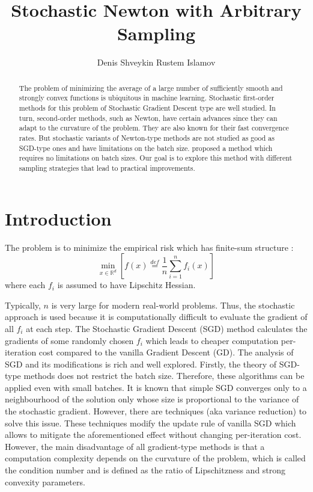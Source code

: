 \documentclass{article}
\title{Stochastic Newton with Arbitrary Sampling}
\author{Denis Shveykin
	\And
	Rustem Islamov
}
\date{}
\theoremstyle{definition}
\theoremstyle{assumption}
\theoremstyle{lemma}
\theoremstyle{theorem}
\theoremstyle{proposition}
\begin{document}
	
\maketitle

\begin{abstract}
	
	The problem of minimizing the average of a large number of sufficiently smooth and strongly convex functions is ubiquitous in machine learning. Stochastic first-order methods for this problem of Stochastic Gradient Descent type are well studied. In turn, second-order methods, such as Newton, have certain advances since they can adapt to the curvature of the problem. They are also known for their fast convergence rates. But stochastic variants of Newton-type methods are not studied as good as SGD-type ones and have limitations on the batch size. \cite{kovalev2019stochastic} proposed a method which requires no limitations on batch sizes. Our goal is to explore this method with different sampling strategies that lead to practical improvements.
	
\end{abstract}



\section{Introduction}

	The problem is to minimize the empirical risk which has finite-sum structure \cite{kovalev2019stochastic}:
	\begin{equation}\label{ERM}
		\underset{x \in \mathbb R^d}{\min} \left[ f(x) \overset{def}{=} \frac{1}{n} \sum \limits_{i=1}^n f_i(x) \right]
	\end{equation}
	where each $f_i$ is assumed to have Lipschitz Hessian. 
	
	Typically, $n$ is very large for modern real-world problems. Thus, the stochastic approach is used because it is computationally difficult to evaluate the gradient of all $f_i$ at each step. The Stochastic Gradient Descent (SGD) method \cite{SGD-1} calculates the gradients of some randomly chosen $f_i$ which leads to cheaper computation per-iteration cost compared to the vanilla Gradient Descent (GD). The analysis of SGD and its modifications is rich and well explored. Firstly, the theory of SGD-type methods does not restrict the batch size. Therefore, these algorithms can be applied even with small batches. It is known that simple SGD converges only to a neighbourhood of the solution only \cite{sgd-hogwild, sgd-general-analysis} whose size is proportional to the variance of the stochastic gradient. However, there are techniques (aka variance reduction) to solve this issue. These techniques \cite{exp-convergence, advances-NIPS, unified-sgd, one-method} modify the update rule of vanilla SGD which allows to mitigate the aforementioned effect without changing per-iteration cost. However, the main disadvantage of all gradient-type methods is that a computation complexity depends on the curvature of the problem, which is called the condition number and is defined as the ratio of Lipschitzness and strong convexity parameters. 
	
\end{document}
